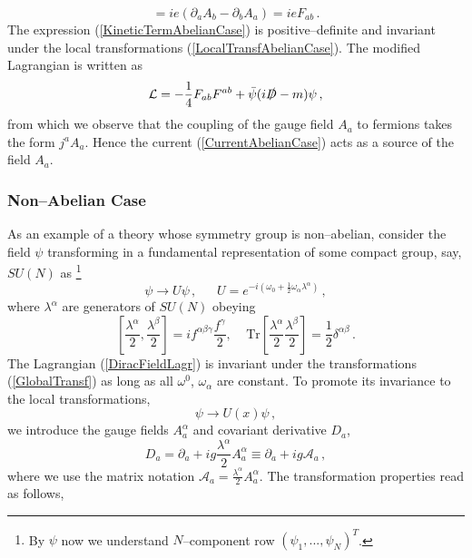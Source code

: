 \documentclass[12pt]{article}
\begin{document}
\begin{equation}
[D_a,D_b]=ie(\partial_a A_b-\partial_b A_a)=ieF_{ab}   \,.
\end{equation}
The expression (\ref{KineticTermAbelianCase}) is positive--definite and invariant under the local transformations (\ref{LocalTransfAbelianCase}). The modified Lagrangian is written as
\begin{equation}
\mathcal{L}=-\dfrac{1}{4}F_{ab}F^{ab}+\bar{\psi}(i\slashed{D}-m)\psi   \,,
\end{equation}
from which we observe that the coupling of the gauge field $A_a$ to fermions takes the form $j^a A_a$. Hence the current (\ref{CurrentAbelianCase}) acts as a source of the field $A_a$.

\subsubsection{Non--Abelian Case}
As an example of a theory whose symmetry group is non--abelian, consider the field $\psi$ transforming in a fundamental representation of some compact group, say, $SU(N)$ as \footnote{By $\psi$ now we understand $N$--component row $(\psi_1,...,\psi_N)^T$.}
\begin{equation}\label{GlobalTransf}
\psi\rightarrow U\psi \,, ~~~~~~~ U=e^{-i(\omega_0+\frac{1}{2}\omega_\alpha\lambda^\alpha)}  \,,
\end{equation}
where $\lambda^\alpha$ are generators of $SU(N)$ obeying
\begin{equation}
\left[\dfrac{\lambda^\alpha}{2},\dfrac{\lambda^\beta}{2}\right]=if^{\alpha\beta\gamma}\dfrac{f^\gamma}{2},~~~~~\text{Tr}\left[\dfrac{\lambda^\alpha}{2}\dfrac{\lambda^\beta}{2}\right]=\dfrac{1}{2}\delta
^{\alpha\beta}  \,.
\end{equation}
The Lagrangian (\ref{DiracFieldLagr}) is invariant under the transformations (\ref{GlobalTransf}) as long as all $\omega^0$, $\omega_\alpha$ are constant. To promote its invariance to the local transformations,
\begin{equation}
\psi\rightarrow U(x)\psi  \,,
\end{equation}
we introduce the gauge fields $A^\alpha_a$ and covariant derivative $D_a$,
\begin{equation}
D_a=\partial_a+ig\dfrac{\lambda^\alpha}{2}A^\alpha_a\equiv\partial_a+ig\mathcal{A}_a  \,,
\end{equation}
where we use the matrix notation $\mathcal{A}_a=\frac{\lambda^\alpha}{2}A^\alpha_a$. The transformation properties read as follows,
\end{document}
